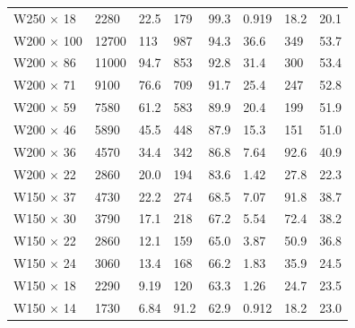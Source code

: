 \documentclass[
10pt,
a4paper,
openany,
svgnames,
]{book}
\begin{document}
\begin{table}[H]
\begin{tabular}{ L{2.2cm} R{1cm} C{2cm} C{2cm} C{1cm} C{2cm} C{2cm} C{1cm}}
    W250 $\times$ 18  & 2280  & 22.5 & 179  & 99.3 & 0.919 & 18.2 & 20.1 \\
    W200 $\times$ 100 & 12700 & 113  & 987  & 94.3 & 36.6  & 349  & 53.7 \\
    W200 $\times$ 86  & 11000 & 94.7 & 853  & 92.8 & 31.4  & 300  & 53.4 \\
    W200 $\times$ 71  & 9100  & 76.6 & 709  & 91.7 & 25.4  & 247  & 52.8 \\
    W200 $\times$ 59  & 7580  & 61.2 & 583  & 89.9 & 20.4  & 199  & 51.9 \\
    W200 $\times$ 46  & 5890  & 45.5 & 448  & 87.9 & 15.3  & 151  & 51.0 \\
    W200 $\times$ 36  & 4570  & 34.4 & 342  & 86.8 & 7.64  & 92.6 & 40.9 \\
    W200 $\times$ 22  & 2860  & 20.0 & 194  & 83.6 & 1.42  & 27.8 & 22.3 \\
    W150 $\times$ 37  & 4730  & 22.2 & 274  & 68.5 & 7.07  & 91.8 & 38.7 \\
    W150 $\times$ 30  & 3790  & 17.1 & 218  & 67.2 & 5.54  & 72.4 & 38.2 \\
    W150 $\times$ 22  & 2860  & 12.1 & 159  & 65.0 & 3.87  & 50.9 & 36.8 \\
    W150 $\times$ 24  & 3060  & 13.4 & 168  & 66.2 & 1.83  & 35.9 & 24.5 \\
    W150 $\times$ 18  & 2290  & 9.19 & 120  & 63.3 & 1.26  & 24.7 & 23.5 \\
    W150 $\times$ 14  & 1730  & 6.84 & 91.2 & 62.9 & 0.912 & 18.2 & 23.0 \\
    \bottomrule
  \end{tabular}
\end{table}
\end{document}
